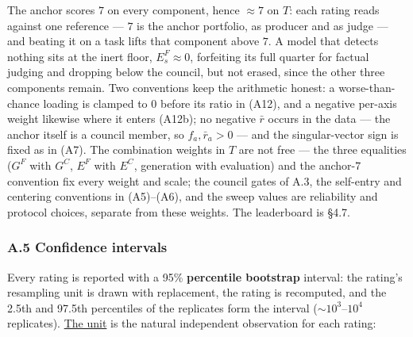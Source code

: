 The anchor scores \(7\) on every component, hence \(\approx7\) on \(T\): each rating reads against one reference --- \(7\) is the anchor portfolio, as producer and as judge --- and beating it on a task lifts that component above \(7\). A model that detects nothing sits at the inert floor, \(E^{F}_s\approx0\), forfeiting its full quarter for factual judging and dropping below the council, but not erased, since the other three components remain. Two conventions keep the arithmetic honest: a worse-than-chance loading is clamped to \(0\) before its ratio in (A12), and a negative per-axis weight likewise where it enters (A12b); no negative \(\bar r\) occurs in the data --- the anchor itself is a council member, so \(f_a,\bar r_a>0\) --- and the singular-vector sign is fixed as in (A7). The combination weights in \(T\) are not free --- the three equalities (\(G^{F}\) with \(G^{C}\), \(E^{F}\) with \(E^{C}\), generation with evaluation) and the anchor-\(7\) convention fix every weight and scale; the council gates of A.3, the self-entry and centering conventions in (A5)--(A6), and the sweep values are reliability and protocol choices, separate from these weights. The leaderboard is §4.7.

\subsubsection{A.5 Confidence intervals}\label{a.5-confidence-intervals}

Every rating is reported with a 95\% \textbf{percentile bootstrap} interval: the rating's resampling unit is drawn with replacement, the rating is recomputed, and the 2.5th and 97.5th percentiles of the replicates form the interval (\(\sim10^3\)--\(10^4\) replicates). \hyperref[tab-bootstrap-units]{The unit} is the natural independent observation for each rating:

\protect{}\label{tab-bootstrap-units}{}

